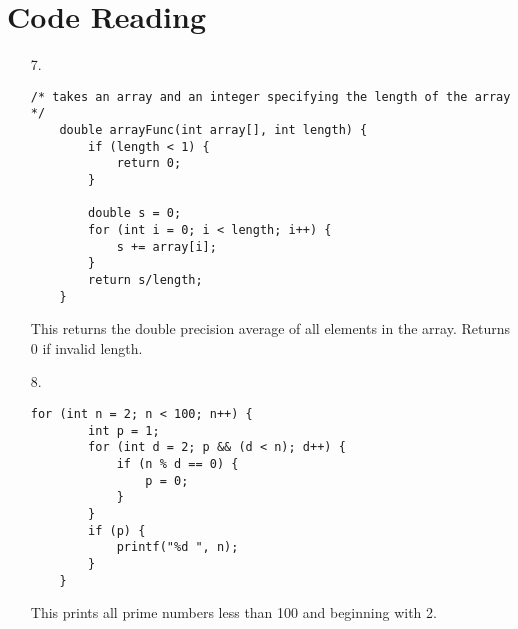 \documentclass{article}
\begin{document}
\section*{Code Reading}
\begin{itemize}
	\item[7.] 
	\begin{lstlisting}[style=nonumbers]
	/* takes an array and an integer specifying the length of the array */
	double arrayFunc(int array[], int length) {
		if (length < 1) {
			return 0;
		}

		double s = 0;
		for (int i = 0; i < length; i++) {
			s += array[i];
		}
		return s/length;
	}
	\end{lstlisting}
	\begin{answer*}
		This returns the double precision average of all elements in the array. Returns 0 if invalid length.
		
	\end{answer*}
	
	\item[8.]
	\begin{lstlisting}[style=nonumbers]
	for (int n = 2; n < 100; n++) {
		int p = 1;
		for (int d = 2; p && (d < n); d++) {
			if (n % d == 0) {
				p = 0;
			}
		}
		if (p) {
			printf("%d ", n);
		}
	}
	\end{lstlisting}
	\begin{answer*}
		This prints all prime numbers less than 100 and beginning with 2.

	\end{answer*}
	
\end{itemize}
\end{document}
